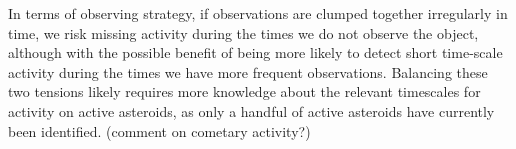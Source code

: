 In terms of observing strategy, if observations are clumped together
irregularly in time, we risk missing activity during the times we do
not observe the object, although with the possible benefit of being
more likely to detect short time-scale activity during the times we
have more frequent observations. Balancing these two tensions likely
requires more knowledge about the relevant timescales for activity on
active asteroids, as only a handful of active asteroids have currently
been identified. (comment on cometary activity?)

%
%
%
%
%
%
%
%
%
%
%
%
